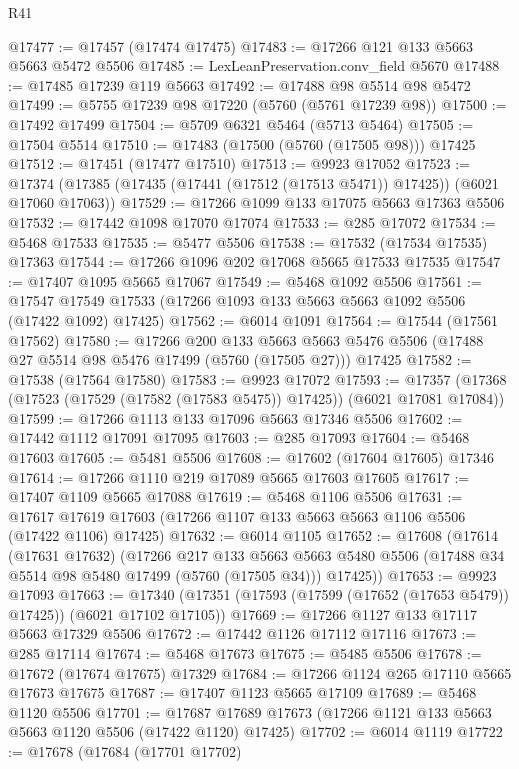 \begin{lexlean}{R41}
\begin{coremodule}
@17477 := @17457 (@17474 @17475)
@17483 := @17266 @121 @133 @5663 @5663 @5472 @5506
@17485 := LexLeanPreservation.conv_field @5670
@17488 := @17485 @17239 @119 @5663
@17492 := @17488 @98 @5514 @98 @5472
@17499 := @5755 @17239 @98 @17220 (@5760 (@5761 @17239 @98))
@17500 := @17492 @17499
@17504 := @5709 @6321 @5464 (@5713 @5464)
@17505 := @17504 @5514
@17510 := @17483 (@17500 (@5760 (@17505 @98))) @17425
@17512 := @17451 (@17477 @17510)
@17513 := @9923 @17052
@17523 := @17374 (@17385 (@17435 (@17441 (@17512 (@17513 @5471)) @17425)) (@6021 @17060 @17063))
@17529 := @17266 @1099 @133 @17075 @5663 @17363 @5506
@17532 := @17442 @1098 @17070 @17074
@17533 := @285 @17072
@17534 := @5468 @17533
@17535 := @5477 @5506
@17538 := @17532 (@17534 @17535) @17363
@17544 := @17266 @1096 @202 @17068 @5665 @17533 @17535
@17547 := @17407 @1095 @5665 @17067
@17549 := @5468 @1092 @5506
@17561 := @17547 @17549 @17533 (@17266 @1093 @133 @5663 @5663 @1092 @5506 (@17422 @1092) @17425)
@17562 := @6014 @1091
@17564 := @17544 (@17561 @17562)
@17580 := @17266
    @200
    @133
    @5663
    @5663
    @5476
    @5506
    (@17488 @27 @5514 @98 @5476 @17499 (@5760 (@17505 @27)))
    @17425
@17582 := @17538 (@17564 @17580)
@17583 := @9923 @17072
@17593 := @17357 (@17368 (@17523 (@17529 (@17582 (@17583 @5475)) @17425)) (@6021 @17081 @17084))
@17599 := @17266 @1113 @133 @17096 @5663 @17346 @5506
@17602 := @17442 @1112 @17091 @17095
@17603 := @285 @17093
@17604 := @5468 @17603
@17605 := @5481 @5506
@17608 := @17602 (@17604 @17605) @17346
@17614 := @17266 @1110 @219 @17089 @5665 @17603 @17605
@17617 := @17407 @1109 @5665 @17088
@17619 := @5468 @1106 @5506
@17631 := @17617 @17619 @17603 (@17266 @1107 @133 @5663 @5663 @1106 @5506 (@17422 @1106) @17425)
@17632 := @6014 @1105
@17652 := @17608
    (@17614
      (@17631 @17632)
      (@17266
        @217
        @133
        @5663
        @5663
        @5480
        @5506
        (@17488 @34 @5514 @98 @5480 @17499 (@5760 (@17505 @34)))
        @17425))
@17653 := @9923 @17093
@17663 := @17340 (@17351 (@17593 (@17599 (@17652 (@17653 @5479)) @17425)) (@6021 @17102 @17105))
@17669 := @17266 @1127 @133 @17117 @5663 @17329 @5506
@17672 := @17442 @1126 @17112 @17116
@17673 := @285 @17114
@17674 := @5468 @17673
@17675 := @5485 @5506
@17678 := @17672 (@17674 @17675) @17329
@17684 := @17266 @1124 @265 @17110 @5665 @17673 @17675
@17687 := @17407 @1123 @5665 @17109
@17689 := @5468 @1120 @5506
@17701 := @17687 @17689 @17673 (@17266 @1121 @133 @5663 @5663 @1120 @5506 (@17422 @1120) @17425)
@17702 := @6014 @1119
@17722 := @17678
    (@17684
      (@17701 @17702)

\end{coremodule}
\end{lexlean}
